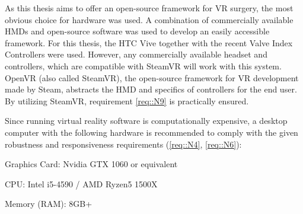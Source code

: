 As this thesis aims to offer an open-source framework for VR surgery, the most obvious choice for hardware was used.
A combination of commercially available HMDs and open-source software was used to develop an easily accessible framework.
For this thesis, the HTC Vive \cite{Vive} together with the recent Valve Index Controllers \cite{ValveIndex} were used.
However, any commercially available headset and controllers, which are compatible with SteamVR will work with this system.
OpenVR \cite{OpenVR} (also called SteamVR), the open-source framework for VR development made by Steam, abstracts the HMD and specifics of controllers for the end user.
By utilizing SteamVR, requirement \ref{req::N9} is practically ensured.

Since running virtual reality software is computationally expensive, a desktop computer with the following hardware is recommended to comply with the given robustness 
and responsiveness requirements (\ref{req::N4}, \ref{req::N6}):

\begin{compactenum}[label=(\alph*)]
    \item Graphics Card: Nvidia GTX 1060 or equivalent
    \item CPU: Intel i5-4590 / AMD Ryzen5 1500X
    \item Memory (RAM): 8GB+
\end{compactenum}

